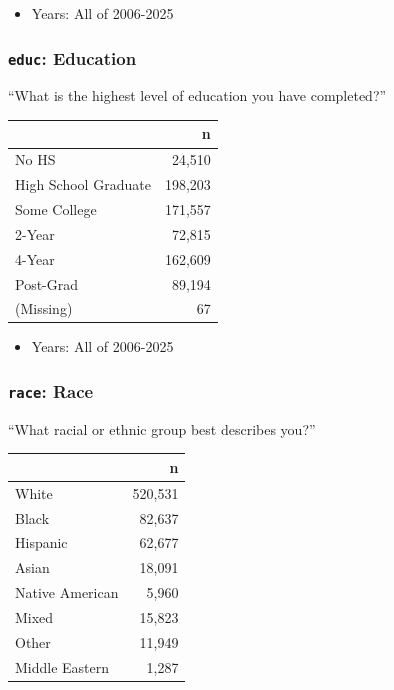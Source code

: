 \documentclass[10pt,article,oneside]{memoir}
\begin{document}
\begin{itemize}
\tightlist
\item
  Years: All of 2006-2025
\end{itemize}

\subsubsection{\texorpdfstring{\texttt{educ}:
Education}{educ: Education}}\label{educ-education}

``What is the highest level of education you have completed?''

\begin{table}[H]
\centering
\begin{tabular}[t]{lr}
\toprule
 & n\\
\midrule
No HS & 24,510\\
High School Graduate & 198,203\\
Some College & 171,557\\
2-Year & 72,815\\
4-Year & 162,609\\
Post-Grad & 89,194\\
(Missing) & 67\\
\bottomrule
\end{tabular}
\end{table}

\begin{itemize}
\tightlist
\item
  Years: All of 2006-2025
\end{itemize}

\subsubsection{\texorpdfstring{\texttt{race}:
Race}{race: Race}}\label{race-race}

``What racial or ethnic group best describes you?''

\begin{table}[H]
\centering
\begin{tabular}[t]{lr}
\toprule
 & n\\
\midrule
White & 520,531\\
Black & 82,637\\
Hispanic & 62,677\\
Asian & 18,091\\
Native American & 5,960\\
Mixed & 15,823\\
Other & 11,949\\
Middle Eastern & 1,287\\
\bottomrule
\end{tabular}
\end{table}
\end{document}
